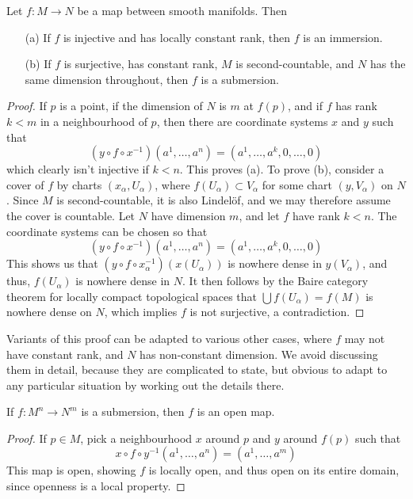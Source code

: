 \begin{theorem}
    Let $f: M \to N$ be a map between smooth manifolds. Then
    \begin{enumerate}
        \item[(a)] If $f$ is injective and has locally constant rank, then $f$ is an immersion.
        \item[(b)] If $f$ is surjective, has constant rank, $M$ is second-countable, and $N$ has the same dimension throughout, then $f$ is a submersion.
    \end{enumerate}
\end{theorem}
\begin{proof}
    If $p$ is a point, if the dimension of $N$ is $m$ at $f(p)$, and if $f$ has rank $k < m$ in a neighbourhood of $p$, then there are coordinate systems $x$ and $y$ such that
    \[ (y \circ f \circ x^{-1})(a^1, \dots, a^n) = (a^1, \dots, a^k, 0, \dots, 0) \]
    which clearly isn't injective if $k < n$. This proves (a). To prove (b), consider a cover of $f$ by charts $(x_\alpha, U_\alpha)$, where $f(U_\alpha) \subset V_\alpha$ for some chart $(y,V_\alpha)$ on $N$. Since $M$ is second-countable, it is also Lindel\"{o}f, and we may therefore assume the cover is countable. Let $N$ have dimension $m$, and let $f$ have rank $k < n$. The coordinate systems can be chosen so that
    \[ (y \circ f \circ x^{-1})(a^1, \dots, a^n) = (a^1, \dots, a^k, 0, \dots, 0) \]
    This shows us that $(y \circ f \circ x_\alpha^{-1})(x(U_\alpha))$ is nowhere dense in $y(V_\alpha)$, and thus, $f(U_\alpha)$ is nowhere dense in $N$. It then follows by the Baire category theorem for locally compact topological spaces that $\bigcup f(U_\alpha) = f(M)$ is nowhere dense on $N$, which implies $f$ is not surjective, a contradiction.
\end{proof}

Variants of this proof can be adapted to various other cases, where $f$ may not have constant rank, and $N$ has non-constant dimension. We avoid discussing them in detail, because they are complicated to state, but obvious to adapt to any particular situation by working out the details there.

\begin{theorem}
    If $f:M^n \to N^m$ is a submersion, then $f$ is an open map.
\end{theorem}
\begin{proof}
    If $p \in M$, pick a neighbourhood $x$ around $p$ and $y$ around $f(p)$ such that
    \[ x \circ f \circ y^{-1}(a^1, \dots, a^n) = (a^1, \dots, a^m) \]
    This map is open, showing $f$ is locally open, and thus open on its entire domain, since openness is a local property.
\end{proof}

